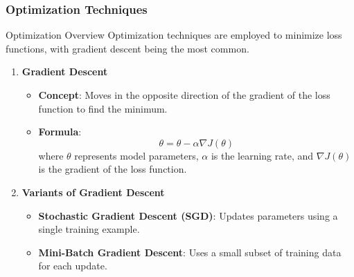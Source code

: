 \documentclass[aspectratio=169]{beamer}
\begin{document}
\begin{frame}
    \frametitle{Optimization Techniques}
    \begin{block}{Optimization Overview}
        Optimization techniques are employed to minimize loss functions, with gradient descent being the most common.
    \end{block}
    
    \begin{enumerate}
        \item \textbf{Gradient Descent}
        \begin{itemize}
            \item \textbf{Concept}: Moves in the opposite direction of the gradient of the loss function to find the minimum.
            \item \textbf{Formula}:
            \begin{equation}
            \theta = \theta - \alpha \nabla J(\theta)
            \end{equation}
            where \( \theta \) represents model parameters, \( \alpha \) is the learning rate, and \( \nabla J(\theta) \) is the gradient of the loss function.
        \end{itemize}
        
        \item \textbf{Variants of Gradient Descent}
        \begin{itemize}
            \item \textbf{Stochastic Gradient Descent (SGD)}: Updates parameters using a single training example.
            \item \textbf{Mini-Batch Gradient Descent}: Uses a small subset of training data for each update.
        \end{itemize}
    \end{enumerate}
\end{frame}
\end{document}
